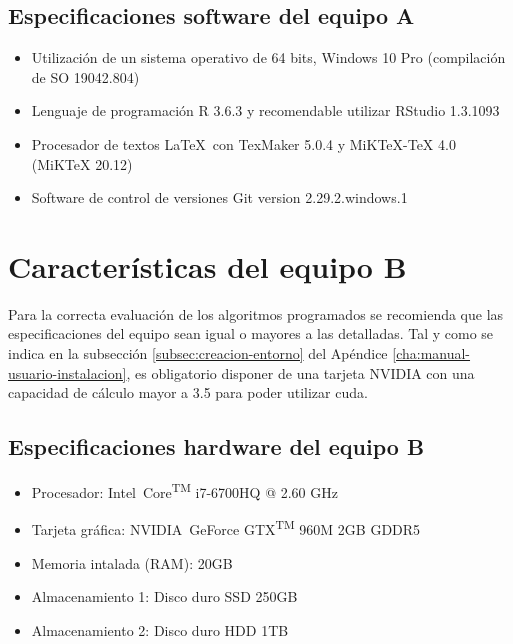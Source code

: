 \subsection{Especificaciones software del equipo A}
\label{subsec:especificaciones-software-equipoa}
\begin{itemize}
    \item Utilización de un sistema operativo de 64 bits, Windows 10 Pro (compilación de SO 19042.804)
    \item Lenguaje de programación R 3.6.3 y recomendable utilizar RStudio 1.3.1093
    \item Procesador de textos \LaTeX\ con TexMaker 5.0.4 y MiKTeX-TeX 4.0 (MiKTeX 20.12)
    \item Software de control de versiones Git version 2.29.2.windows.1
\end{itemize}

\section{Características del equipo B}
\label{sec:caracteristicas-segun-equipob}

Para la correcta evaluación de los algoritmos programados se recomienda que las especificaciones del equipo sean igual o mayores a las detalladas. Tal y como se indica en la subsección \ref{subsec:creacion-entorno} del Apéndice \ref{cha:manual-usuario-instalacion}, es obligatorio disponer de una tarjeta NVIDIA con una capacidad de cálculo mayor a 3.5 para poder utilizar \acrshort{cuda}.

\subsection{Especificaciones hardware del equipo B}
\label{subsec:especificaciones-hardware-equipob}

\begin{itemize}
    \item Procesador: Intel\textregistered\ Core\textsuperscript{TM} i7-6700HQ @ 2.60 GHz
    \item Tarjeta gráfica: NVIDIA\textregistered\ GeForce GTX\textsuperscript{TM} 960M 2GB GDDR5
    \item Memoria intalada (RAM): 20GB
    \item Almacenamiento 1: Disco duro SSD 250GB
    \item Almacenamiento 2: Disco duro HDD 1TB
\end{itemize}

